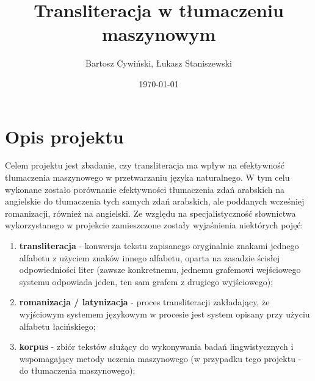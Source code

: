 \documentclass[
    left=2.5cm,         %
    right=2.5cm,        %
    top=2.5cm,          %
    bottom=3cm,         %
    bindingoffset=6mm,  %
    nohyphenation=false %
]{eiti/eiti-report}
\begin{document}
\title{
    Transliteracja w tłumaczeniu maszynowym
}

\author{Bartosz Cywiński, Łukasz Staniszewski}

\date{\today}
\maketitle

\tableofcontents

\cleardoublepage %
\pagestyle{headings}

\newpage %
\section{Opis projektu}
Celem projektu jest zbadanie, czy transliteracja ma wpływ na efektywność tłumaczenia maszynowego w przetwarzaniu języka naturalnego. W tym celu wykonane zostało porównanie efektywności tłumaczenia zdań arabskich na angielskie do tłumaczenia tych samych zdań arabskich, ale poddanych wcześniej romanizacji, również na angielski. Ze względu na specjalistyczność słownictwa wykorzystanego w projekcie zamieszczone zostały wyjaśnienia niektórych pojęć:
\begin {enumerate}
    \item \textbf{transliteracja} - konwersja tekstu zapisanego oryginalnie znakami jednego alfabetu z użyciem znaków innego alfabetu, oparta na zasadzie ścisłej odpowiedniości liter (zawsze konkretnemu, jednemu grafemowi wejściowego systemu odpowiada jeden, ten sam grafem z drugiego wyjściowego);
    \item \textbf{romanizacja / latynizacja} - proces transliteracji zakładający, że wyjściowym systemem językowym w procesie jest system opisany przy użyciu alfabetu łacińskiego;
    \item \textbf{korpus} - zbiór tekstów służący do wykonywania badań lingwistycznych i wspomagający metody uczenia maszynowego (w przypadku tego projektu - do tłumaczenia maszynowego); 
\end{enumerate}
\end{document}
